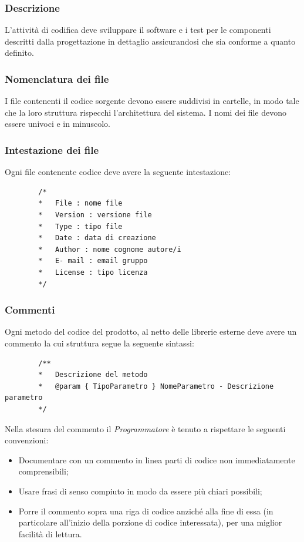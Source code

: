 \documentclass[../NomeDocumento.tex]{subfiles}
\begin{document}
	\subsubsection{Descrizione}
	L'attività di codifica deve sviluppare il software e i test per le componenti descritti dalla progettazione in dettaglio assicurandosi che sia conforme a quanto definito. 
	
	\subsubsection{Nomenclatura dei file}
	I file contenenti il codice sorgente devono essere suddivisi in cartelle, in modo tale che la
	loro struttura rispecchi l’architettura del sistema. I nomi dei file devono essere univoci
	e in minuscolo.
	
	\subsubsection{Intestazione dei file}
	Ogni file contenente codice deve avere la seguente intestazione:
	
	\begin{verbatim}
		/*
		* 	File : nome file
		* 	Version : versione file
		* 	Type : tipo file
		* 	Date : data di creazione
		* 	Author : nome cognome autore/i
		* 	E- mail : email gruppo
		* 	License : tipo licenza
		*/
	\end{verbatim}

	\subsubsection{Commenti}
	Ogni metodo del codice del prodotto, al netto delle librerie esterne deve avere un commento la cui struttura segue la seguente sintassi:
	
	\begin{verbatim}
		/**
		* 	Descrizione del metodo
		* 	@param { TipoParametro } NomeParametro - Descrizione parametro
		*/
	\end{verbatim}

	Nella stesura del commento il \textit{Programmatore} è tenuto a rispettare le seguenti convenzioni:
	\begin{itemize}
		\item Documentare con un commento in linea parti di codice non immediatamente comprensibili;
		\item Usare frasi di senso compiuto in modo da essere più chiari possibili;
		\item Porre il commento sopra una riga di codice anziché alla fine di essa (in
		particolare all’inizio della porzione di codice interessata), per una miglior facilità
		di lettura.
	\end{itemize}
	
\end{document}
